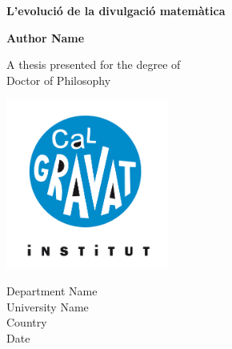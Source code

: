 \begin{titlepage}
    \begin{center}
        \vspace*{1cm}
            
        \Huge
        \textbf{L'evolució de la divulgació matemàtica}
            
        \vspace{0.5cm}
            
        \vspace{2cm}
            
        \textbf{Author Name}
            
        \vfill
            
        A thesis presented for the degree of\\
        Doctor of Philosophy
            
        \vspace{0.8cm}
            
        \includegraphics[width=0.4\textwidth]{../img/logo_cal_gravat}
            
        \Large
        Department Name\\
        University Name\\
        Country\\
        Date
            
    \end{center}
\end{titlepage}
